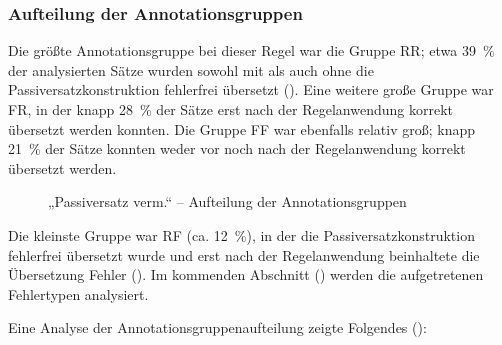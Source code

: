 \subsubsection{\label{sec:5.3.7.2}Aufteilung der Annotationsgruppen}

Die größte Annotationsgruppe bei dieser Regel war die Gruppe RR; etwa 39~\% der analysierten Sätze wurden sowohl mit als auch ohne die Passiversatzkonstruktion fehlerfrei übersetzt (). Eine weitere große Gruppe war FR, in der knapp 28~\% der Sätze erst nach der Regelanwendung korrekt übersetzt werden konnten. Die Gruppe FF war ebenfalls relativ groß; knapp 21~\% der Sätze konnten weder vor noch nach der Regelanwendung korrekt übersetzt werden.


\begin{figure}



\caption{\label{fig:05:101}„Passiversatz verm.“ -- Aufteilung der Annotationsgruppen   }
\end{figure}

Die kleinste Gruppe war RF (ca. 12~\%), in der die Passiversatzkonstruktion fehlerfrei übersetzt wurde und erst nach der Regelanwendung beinhaltete die Übersetzung Fehler (). Im kommenden Abschnitt () werden die aufgetretenen Fehlertypen analysiert.


Eine Analyse der Annotationsgruppenaufteilung zeigte Folgendes ():


